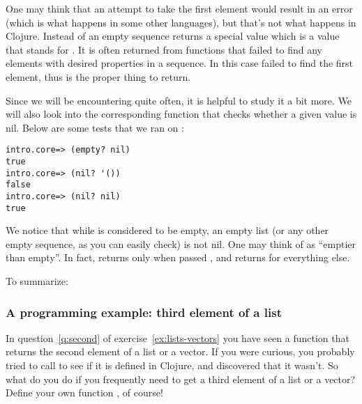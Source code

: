 One may think that an attempt to take the first element would result in an error (which is what happens in some other languages), but that's not what happens in Clojure. Instead  of an empty sequence returns a special value  which is a value that stands for . It is often returned from functions that failed to find any elements with desired properties in a sequence. In this case  failed to find the first element, thus  is the proper thing to return. 

Since we will be encountering  quite often, it is helpful to study it a bit more. We will also look into the corresponding function  that checks whether a given value is nil. Below are some tests that we ran on  :
\begin{framed}
\begin{verbatim}
intro.core=> (empty? nil)
true
intro.core=> (nil? '())
false
intro.core=> (nil? nil)
true
\end{verbatim}
\end{framed}
We notice that while  is considered to be empty, an empty list (or any other empty sequence, as you can easily check) is not nil. One may think of   as ``emptier than empty''. In fact,  returns  only when passed , and returns  for everything else. 

To summarize: 

\subsubsection{A programming example: third element of a list}\label{subsubsec:third}
In question~\ref{q:second} of exercise~\ref{ex:lists-vectors} you have seen a function  that returns the second element of a list or a vector. If you were curious, you probably tried to call  to see if it is defined in Clojure, and discovered that it wasn't. So what do you do if you frequently need to get a third element of a list or a vector? Define your own function , of course! 

